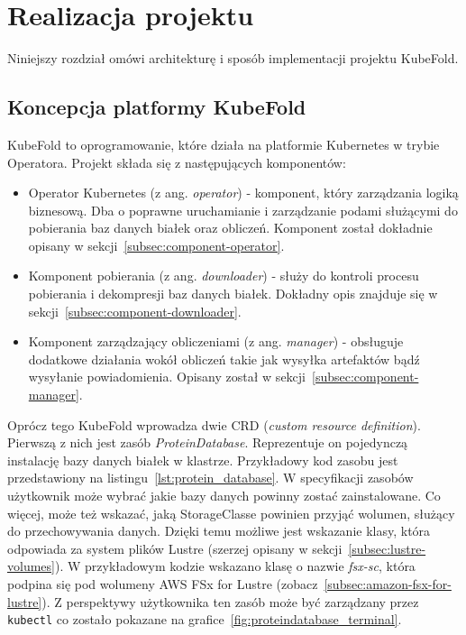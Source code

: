 \chapter{Realizacja projektu}
Niniejszy rozdział omówi architekturę i sposób implementacji projektu KubeFold.


\section{Koncepcja platformy KubeFold}
KubeFold to oprogramowanie, które działa na platformie Kubernetes w trybie Operatora.
Projekt składa się z następujących komponentów:
\begin{itemize}
    \item Operator Kubernetes (z ang. \textit{operator}) - komponent, który zarządzania logiką biznesową.
    Dba o poprawne uruchamianie i zarządzanie podami służącymi do pobierania baz danych białek oraz obliczeń.
    Komponent został dokładnie opisany w sekcji~\ref{subsec:component-operator}.
    \item Komponent pobierania (z ang. \textit{downloader}) - służy do kontroli procesu pobierania i dekompresji baz danych białek.
    Dokładny opis znajduje się w sekcji~\ref{subsec:component-downloader}.
    \item Komponent zarządzający obliczeniami (z ang. \textit{manager}) - obsługuje dodatkowe działania wokół obliczeń takie jak wysyłka artefaktów bądź wysyłanie powiadomienia.
    Opisany został w sekcji~\ref{subsec:component-manager}.
\end{itemize}

Oprócz tego KubeFold wprowadza dwie CRD (\textit{custom resource definition}). Pierwszą z nich jest zasób \textit{ProteinDatabase}.
Reprezentuje on pojedynczą instalację bazy danych białek w klastrze.
Przykładowy kod zasobu jest przedstawiony na listingu~\ref{lst:protein_database}.
W specyfikacji zasobów użytkownik może wybrać jakie bazy danych powinny zostać zainstalowane.
Co więcej, może też wskazać, jaką StorageClasse powinien przyjąć wolumen, służący do przechowywania danych.
Dzięki temu możliwe jest wskazanie klasy, która odpowiada za system plików Lustre (szerzej opisany w sekcji~\ref{subsec:lustre-volumes}).
W przykładowym kodzie wskazano klasę o nazwie \textit{fsx-sc}, która podpina się pod wolumeny AWS FSx for Lustre (zobacz~\ref{subsec:amazon-fsx-for-lustre}).
Z perspektywy użytkownika ten zasób może być zarządzany przez \texttt{kubectl} co zostało pokazane na grafice~\ref{fig:proteindatabase_terminal}.

